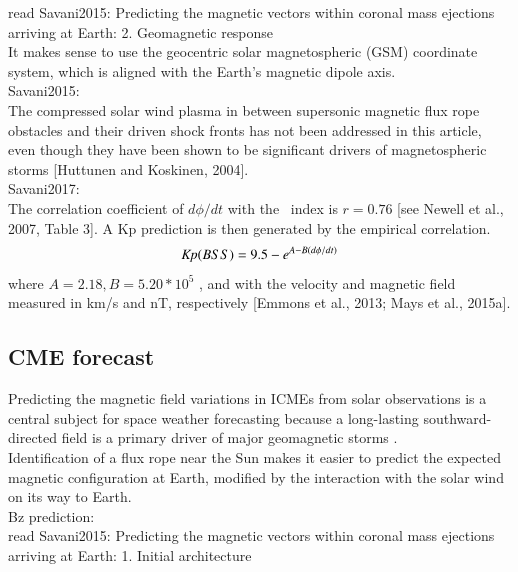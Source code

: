 read Savani2015: Predicting the magnetic vectors within coronal mass ejections arriving at Earth: 2. Geomagnetic response\\

It makes sense to use the geocentric solar magnetospheric (GSM) coordinate system, which is aligned with the Earth's magnetic dipole axis.\\

Savani2015:\\
The compressed solar wind plasma in between supersonic magnetic flux rope obstacles and their driven shock fronts has not been addressed in this article, even though they have been shown to be significant drivers of magnetospheric storms [Huttunen and Koskinen, 2004].\\

Savani2017:\\
The correlation coefficient of $d\phi/dt$ with the \Kp~index is $r = 0.76$ [see Newell et al., 2007, Table 3]. A Kp prediction is then generated by the empirical correlation.\\
\begin{align}
	\textit{Kp}(BSS) = 9.5 - e^{A-B(d\phi/dt)}
\end{align}
where $A = 2.18, B = 5.20 * 10^5$ , and with the velocity and magnetic field measured in km/s and nT, respectively [Emmons et al., 2013; Mays et al., 2015a].\\


\subsection{CME forecast}

Predicting the magnetic field variations in ICMEs from solar observations is a central subject for space weather forecasting because a long-lasting southward-directed  field is a primary driver of major geomagnetic storms \citep{Zhang2007}.\\

Identification of a flux rope near the Sun makes it easier to predict the expected magnetic configuration at Earth, modified by the interaction with the solar wind on its way to Earth.\\

Bz prediction:\\
read Savani2015: Predicting the magnetic vectors within coronal mass ejections arriving at Earth: 1. Initial architecture\\

